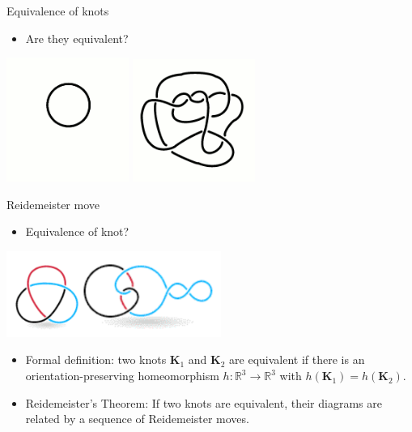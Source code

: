 \documentclass[]{beamer}
\begin{document}
\begin{frame}{Equivalence of knots}
\begin{itemize}
    \item Are they equivalent?
\end{itemize}
\centering
    \includegraphics[width = 4cm]{Pictures/Simple.png}
    \includegraphics[width = 4cm]{Pictures/complex.png}
\end{frame}


\begin{frame}{Reidemeister move}
\begin{itemize}
    \item Equivalence of knot?
\end{itemize}
\centering
\includegraphics[width=7cm]{Pictures/equivalence.png}

\begin{itemize}
    \item Formal definition: two knots $\mathbf{K}_1$ and $\mathbf{K}_2$ are equivalent if there is an orientation-preserving homeomorphism $h:\mathbb{R}^3 \rightarrow \mathbb{R}^3$ with $h(\mathbf{K}_1) = h(\mathbf{K}_2)$.
\end{itemize}

\begin{itemize}
    \item Reidemeister's Theorem: If two knots are equivalent, their diagrams are related by a sequence of Reidemeister moves.
\end{itemize}
\end{frame}
\end{document}
